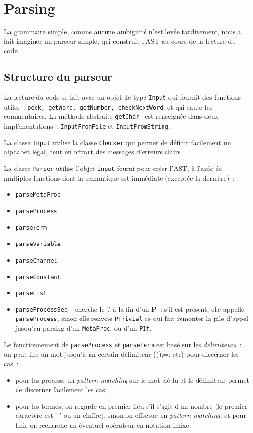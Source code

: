 \documentclass[11pt]{article} %
\begin{document}
\section{Parsing}

La grammaire simple, comme aucune ambiguïté n'est levée tardivement, nous a fait imaginer un parseur simple, qui construit l'AST au cours de la lecture du code.

\subsection{Structure du parseur}

La lecture du code se fait avec un objet de type \texttt{Input} qui fournit des fonctions utiles~: \texttt{peek, getWord, getNumber, checkNextWord}, et qui saute les commentaires.
La méthode abstraite \texttt{getChar\_} est renseignée dans deux implémentations~: \texttt{InputFromFile} et \texttt{InputFromString}.

La classe \texttt{Input} utilise la classe \texttt{Checker} qui permet de définir facilement un alphabet légal, tout en  offrant des messages d'erreurs clairs.

La classe \texttt{Parser} utilise l'objet \texttt{Input} fourni pour créer l'AST, à l'aide de multiples fonctions dont la sémantique est immédiate (exceptée la dernière)~: 
\begin{itemize}
\item \texttt{parseMetaProc} 
\item \texttt{parseProcess}
\item \texttt{parseTerm}
\item \texttt{parseVariable}
\item \texttt{parseChannel}
\item \texttt{parseConstant}
\item \texttt{parseList}
\item \texttt{parseProcessSeq}~: cherche le '.' à la fin d'un \textbf{P}~: s'il est présent, elle appelle \texttt{parseProcess}, sinon elle renvoie \texttt{PTrivial} ce qui fait remonter la pile d'appel jusqu'au parsing d'un \texttt{MetaProc}, ou d'un \texttt{PIf}.
\end{itemize}

Le fonctionnement de \texttt{parseProcess} et \texttt{parseTerm} est basé sur les \emph{délimiteurs}~: on peut lire un mot jusqu'à un certain délimiteur ((),=: etc) pour discerner les cas~:
\begin{itemize}
\item pour les process, un \emph{pattern matching} sur le mot clé lu et le délimiteur permet de discerner facilement les cas;
\item pour les termes, on regarde en premier lieu s'il s'agit d'un nombre (le premier caractère est '-' ou un chiffre), sinon on effectue un \emph{pattern matching}, et pour finir on recherche un éventuel opérateur en notation infixe.
\end{itemize}
\end{document}
